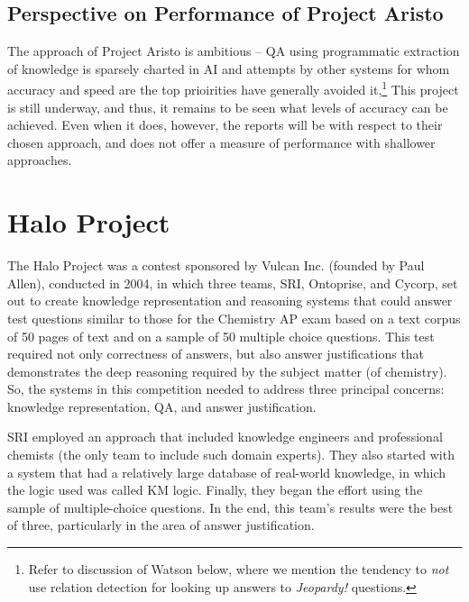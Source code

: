 \subsection{Perspective on Performance of Project Aristo}

The approach of Project Aristo is ambitious -- QA using programmatic extraction of knowledge is sparsely charted in AI and attempts by other systems for whom accuracy and speed are the top prioirities have generally avoided it,\footnote{Refer to discussion of Watson below, where we mention the tendency to \emph{not} use relation detection for looking up answers to \textit{Jeopardy!} questions.}  This project is still underway, and thus, it remains to be seen what levels of accuracy can be achieved.  Even when it does, however, the reports will be with respect to their chosen approach, and does not offer a measure of performance with shallower approaches.


\section{Halo Project}

The Halo Project \cite{friedland2004project} was a contest sponsored by Vulcan Inc. (founded by Paul Allen), conducted in 2004, in which three teams, SRI, Ontoprise, and Cycorp, set out to create knowledge representation and reasoning systems that could answer test questions similar to those for the Chemistry AP exam based on a text corpus of 50 pages of text and on a sample of 50 multiple choice questions.  This test required not only correctness of answers, but also answer justifications that demonstrates the deep reasoning required by the subject matter (of chemistry).  So, the systems in this competition needed to address three principal concerns:  knowledge representation, QA, and answer justification. 

SRI employed an approach that included knowledge engineers and 
professional chemists (the only team to include such domain experts).
They also started with a system that had a relatively large database
of real-world knowledge, in which the logic used was called KM logic.
Finally, they began the effort using the sample of multiple-choice questions.  In the end, this team's results were the best of three, particularly in the area of answer justification.

